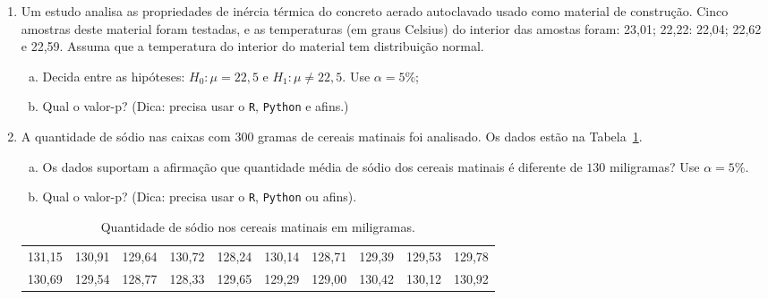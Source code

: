 \documentclass[12pt, a4paper]{article}
\begin{document}
\begin{enumerate}
	\item Um estudo analisa as propriedades de inércia térmica do concreto aerado autoclavado usado como material de construção. Cinco amostras deste material foram testadas, e as temperaturas (em graus Celsius) do interior das amostas foram:  23,01; 22,22: 22,04; 22,62 e 22,59. Assuma que a temperatura do interior do material tem distribuição normal.
	\begin{enumerate}[(a)]
		\item Decida entre as hipóteses: $H_0: \mu = 22,5$ e $H_1: \mu \neq 22,5$. Use $\alpha=5\%$;
		\item Qual o valor-p? (Dica: precisa usar o \texttt{R}, \texttt{Python} e afins.)
	\end{enumerate}

	\item A quantidade de sódio nas caixas com $300$ gramas de cereais matinais foi analisado. Os dados estão na Tabela~\ref{tab:cereal-matinal}.
	\begin{enumerate}[(a)]
		\item Os dados suportam a afirmação que quantidade média de sódio dos cereais matinais é diferente de $130$ miligramas? Use $\alpha=5\%$.
		\item Qual o valor-p? (Dica: precisa usar o \texttt{R}, \texttt{Python} ou afins).
	\end{enumerate}
	\begin{table}[ht]
		\centering
		\begin{tabular}{cccccccccc}
			\toprule[0.05cm]
			131,15 & 130,91 & 129,64 & 130,72 & 128,24 & 130,14 & 128,71 & 129,39 & 129,53 & 129,78 \\ 
			130,69 & 129,54 & 128,77 & 128,33 & 129,65 & 129,29 & 129,00 & 130,42 & 130,12 & 130,92 \\ 
			\bottomrule[0.05cm]
		\end{tabular}
		\caption{Quantidade de sódio nos cereais matinais em miligramas.} 
		\label{tab:cereal-matinal}
	\end{table}


\end{enumerate}
\end{document}
